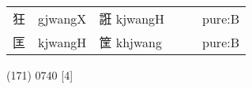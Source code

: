 \documentclass[14pt,a4paper]{scrartcl}
\begin{document}
\begin{longtable}[c]{@{}llllll@{}}
\begin{minipage}[t]{0.14\columnwidth}\raggedright\strut
狂
\strut\end{minipage} &
\begin{minipage}[t]{0.14\columnwidth}\raggedright\strut
gjwangX
\strut\end{minipage} &
\begin{minipage}[t]{0.14\columnwidth}\raggedright\strut
誑 kjwangH
\strut\end{minipage} &
\begin{minipage}[t]{0.14\columnwidth}\raggedright\strut
\strut\end{minipage} &
\begin{minipage}[t]{0.14\columnwidth}\raggedright\strut
\strut\end{minipage} &
\begin{minipage}[t]{0.14\columnwidth}\raggedright\strut
pure:B
\strut\end{minipage}\tabularnewline
\begin{minipage}[t]{0.14\columnwidth}\raggedright\strut
匡
\strut\end{minipage} &
\begin{minipage}[t]{0.14\columnwidth}\raggedright\strut
kjwangH
\strut\end{minipage} &
\begin{minipage}[t]{0.14\columnwidth}\raggedright\strut
筐 khjwang
\strut\end{minipage} &
\begin{minipage}[t]{0.14\columnwidth}\raggedright\strut
\strut\end{minipage} &
\begin{minipage}[t]{0.14\columnwidth}\raggedright\strut
\strut\end{minipage} &
\begin{minipage}[t]{0.14\columnwidth}\raggedright\strut
pure:B
\strut\end{minipage}\tabularnewline
\bottomrule
\end{longtable}

(171) 0740 {[}4{]}
\end{document}

